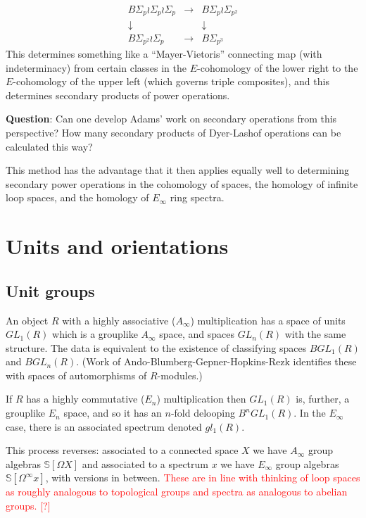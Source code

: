 \documentclass[12pt,titlepage]{article}
\newcommand{\rd}[1]{{\textcolor{red}{#1}}}
\theoremstyle{plain}
\theoremstyle{definition}
\theoremstyle{remark}
\begin{document}
\begin{displaymath}
\begin{matrix}
 B\Sigma_p \wr \Sigma_p \wr \Sigma_p & \longrightarrow & B\Sigma_p \wr \Sigma_{p^2} \\
 \downarrow & & \downarrow\\
 B\Sigma_{p^2} \wr \Sigma_p & \longrightarrow & B\Sigma_{p^3}
 \end{matrix}
\end{displaymath}
This determines something like a ``{}Mayer-Vietoris''{} connecting map (with indeterminacy) from certain classes in the $E$-cohomology of the lower right to the $E$-cohomology of the upper left (which governs triple composites), and this determines secondary products of power operations.

\textbf{Question}: Can one develop Adams'{} work on secondary operations from this perspective? How many secondary products of Dyer-Lashof operations can be calculated this way?

This method has the advantage that it then applies equally well to determining secondary power operations in the cohomology of spaces, the homology of infinite loop spaces, and the homology of $E_\infty$ ring spectra.

\section{Units and orientations}

\hypertarget{unit_groups_1}{}\subsection{{Unit groups}}\label{unit_groups_1}

An object $R$ with a highly associative ($A_\infty$) multiplication has a space of units $GL_1(R)$ which is a grouplike $A_\infty$ space, and spaces $GL_n(R)$ with the same structure. The data is equivalent to the existence of classifying spaces $BGL_1(R)$ and $BGL_n(R)$. (Work of Ando-Blumberg-Gepner-Hopkins-Rezk identifies these with spaces of automorphisms of $R$-modules.)

If $R$ has a highly commutative ($E_n$) multiplication then $GL_1(R)$ is, further, a grouplike $E_n$ space, and so it has an $n$-fold delooping $B^n GL_1(R)$. In the $E_\infty$ case, there is an associated spectrum denoted $gl_1(R)$.

This process reverses: associated to a connected space $X$ we have $A_\infty$ group algebras $\mathbb{S}[\Omega X]$ and associated to a spectrum $x$ we have $E_\infty$ group algebras $\mathbb{S}[\Omega^\infty x]$, with versions in between. \rd{These are in line with thinking of loop spaces as roughly analogous to topological groups and spectra as analogous to abelian groups. [?]}
\end{document}
